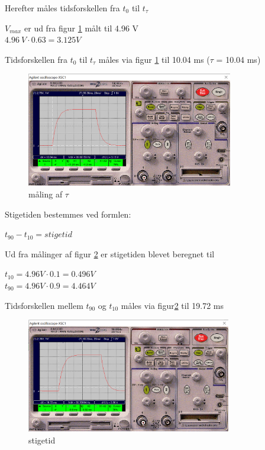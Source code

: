 Herefter måles tidsforskellen fra $t_0$ til $t_{\tau}$

$V_{max}$ er ud fra figur \ref{100k_5Hz_tau} målt til 4.96 V
\\
$4.96 \ V \cdot 0.63 = 3.125 V$

Tidsforskellen fra $t_0$ til $t_{\tau}$ måles via figur \ref{100k_5Hz_tau} til 10.04 ms ($\tau$ = 10.04 ms)

\begin{figure}[h]
 \begin{center}
  \includegraphics[height=5cm]{P_Fig/figur6_100k_5Hz_tau.png}
  \caption{måling af $\tau$}
  \label{100k_5Hz_tau}
 \end{center}
\end{figure}

\newpage

Stigetiden bestemmes ved formlen:
\begin{center}
$t_{90} - t_{10} = stigetid$
\end{center}

Ud fra målinger af figur \ref{100k.5Hz.stigetid}
er stigetiden blevet beregnet til

\begin{center}
$t_{10} = 4.96 V \cdot 0.1 = 0.496 V$
\\
$t_{90} = 4.96 V \cdot 0.9 = 4.464 V$
\end{center}

Tidsforskellen mellem $t_{90}$ og $t_{10}$ måles via figur\ref{100k.5Hz.stigetid} til 19.72 ms

\begin{figure}[h]
 \begin{center}
  \includegraphics[height=5cm]{P_Fig/figur7_100k_5Hz_stigetid.png}
  \caption{stigetid}
  \label{100k.5Hz.stigetid}
 \end{center}
\end{figure}

